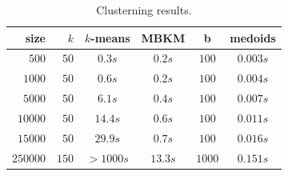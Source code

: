 \begin{table}
  \centering
  \begin{tabular}{ r | r || c | c || c || c }
    size & $k$ & $k$-means & MBKM & b &  medoids \\
    \hline
    \hline
    $500$    &  $50$ &  $0.3s$ &  $\mathbf{0.2}s$ &  $100$ &  $0.003s$ \\
    \hline
    $1000$   &  $50$ &  $0.6s$ &  $\mathbf{0.2}s$ &  $100$ &  $0.004s$ \\
    \hline
    $5000$   &  $50$ &  $6.1s$ &  $\mathbf{0.4}s$ &  $100$ &  $0.007s$ \\
    \hline
    $10000$  &  $50$ & $14.4s$ &  $\mathbf{0.6}s$ & $100$ &   $0.011s$ \\
    \hline
    $15000$  &  $50$ & $29.9s$ &  $\mathbf{0.7}s$ & $100$ &  $0.016s$ \\
    \hline
    $250000$ & $150$ & $>1000s$ & $\mathbf{13.3}s$ &  $1000$  &  $0.151s$ \\
    \hline
  \end{tabular}
  \caption{Clusterning results.}
  \label{tab:results}
\end{table}


